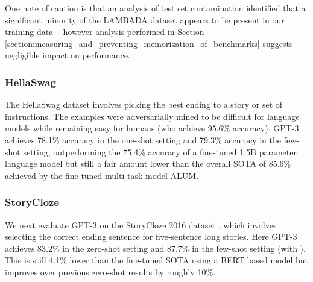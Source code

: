 \documentclass{article}
\begin{document}
One note of caution is that an analysis of test set contamination identified that a significant minority of the LAMBADA dataset appears to be present in our training data -- however analysis performed in Section \ref{section:measuring_and_preventing_memorization_of_benchmarks} suggests negligible impact on performance.         
        \subsubsection{HellaSwag}
        \label{section:HellaSwag}
        The HellaSwag dataset \cite{zellers2019hellaswag} involves picking the best ending to a story or set of instructions.  The examples were adversarially mined to be difficult for language models while remaining easy for humans (who achieve 95.6\% accuracy).  GPT-3 achieves 78.1\% accuracy in the one-shot setting and 79.3\% accuracy in the few-shot setting, outperforming the 75.4\% accuracy of a fine-tuned 1.5B parameter language model \cite{zellers2019defending} but still a fair amount lower than the overall SOTA of 85.6\% achieved by the fine-tuned multi-task model ALUM.
         
        \subsubsection{StoryCloze}
        \label{section:StoryCloze}
        We next evaluate GPT-3 on the StoryCloze 2016 dataset \cite{mostafazadeh2016corpus}, which involves selecting the correct ending sentence for five-sentence long stories.  Here GPT-3 achieves 83.2\% in the zero-shot setting and 87.7\% in the few-shot setting (with ). This is still 4.1\% lower than the fine-tuned SOTA using a BERT based model \cite{li2019story} but improves over previous zero-shot results by roughly 10\%.


         
        
\end{document}
